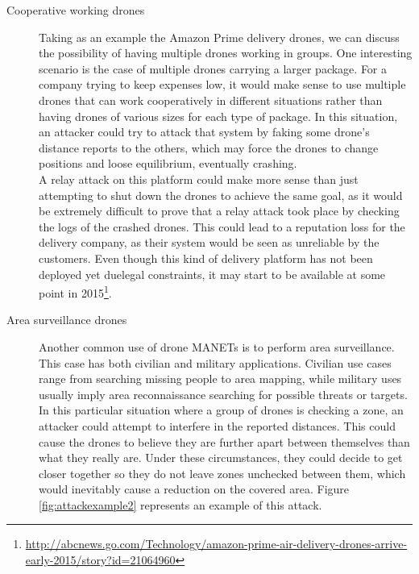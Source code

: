 \documentclass{article}
\begin{document}
\begin{description}
  \item[Cooperative working drones] Taking as an example the Amazon Prime delivery drones, we can discuss the possibility of having multiple drones working in groups. One interesting scenario is the case of multiple drones carrying a larger package. For a company trying to keep expenses low, it would make sense to use multiple drones that can work cooperatively in different situations rather than having drones of various sizes for each type of package. In this situation, an attacker could try to attack that system by faking some drone's distance reports to the others, which may force the drones to change positions and loose equilibrium, eventually crashing.\\
 
  A relay attack on this platform could make more sense than just attempting to shut down the drones to achieve the same goal, as it would be extremely difficult to prove that a relay attack took place by checking the logs of the crashed drones. This could lead to a reputation loss for the delivery company, as their system would be seen as unreliable by the customers. Even though this kind of delivery platform has not been deployed yet duelegal constraints, it may start to be available at some point in 2015\footnote{\url{http://abcnews.go.com/Technology/amazon-prime-air-delivery-drones-arrive-early-2015/story?id=21064960}}.\\
  
  
  \item[Area surveillance drones] Another common use of drone MANETs is to perform area surveillance. This case has both civilian and military applications. Civilian use cases range from searching missing people to area mapping, while military uses usually imply area reconnaissance searching for possible threats or targets.\\
  
  In this particular situation where a group of drones is checking a zone, an attacker could attempt to interfere in the reported distances. This could cause the drones to believe they are further apart between themselves than what they really are. Under these circumstances, they could decide to get closer together so they do not leave zones unchecked between them, which would inevitably cause a reduction on the covered area. Figure \ref{fig:attackexample2} represents an example of this attack.\\
  

\end{description}
\end{document}
